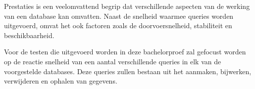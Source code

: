 Prestaties is een veelomvattend begrip dat verschillende aspecten van de werking van een database kan omvatten. Naast de snelheid waarmee queries worden uitgevoerd, omvat het ook factoren zoals de doorvoersnelheid, stabiliteit en beschikbaarheid.

Voor de testen die uitgevoerd worden in deze bachelorproef zal gefocust worden op de reactie snelheid van een aantal verschillende queries in elk van de voorgestelde databases. Deze queries zullen bestaan uit het aanmaken, bijwerken, verwijderen en ophalen van gegevens.
